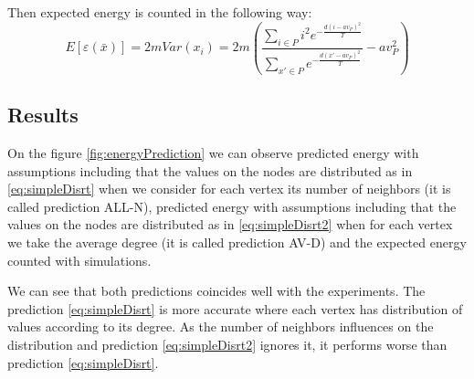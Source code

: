 \documentclass[12pt]{report}
\begin{document}
Then expected energy is counted in the following way:
$$ E[\varepsilon (\bar{x})] = 2mVar(x_i)  = 2m\left(\frac{ \sum\limits_{i\in P} i^2 e^{- \frac{d(i - av_P)^2}{T}} }{ \sum\limits_{x'\in P} e^{-\frac{d(x' - av_P)^2}{T}}} - av_P^2\right)$$


\subsection{Results}

On the figure \ref{fig:energyPrediction} we can observe predicted energy with assumptions including that the values on the nodes are distributed as in \ref{eq:simpleDisrt} when we consider for each vertex its number of neighbors (it is called prediction ALL-N), predicted energy with assumptions including that the values on the nodes are distributed as in \ref{eq:simpleDisrt2} when for each vertex we take the average degree (it is called prediction AV-D) and the expected energy counted with simulations.

We can see that both predictions coincides well with the experiments. The prediction \ref{eq:simpleDisrt} is more accurate where each vertex has distribution of values according to its degree. As the number of neighbors influences on the distribution and prediction \ref{eq:simpleDisrt2} ignores it, it performs worse than prediction \ref{eq:simpleDisrt}.
\end{document}
